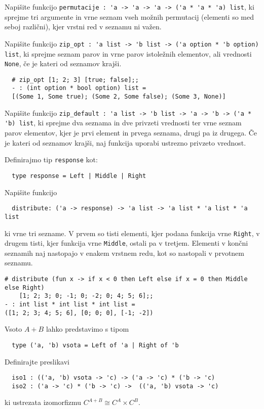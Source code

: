 \documentclass[arhiv]{../izpit}
\begin{document}
	


\naloga

\podnaloga
Napišite funkcijo \verb|permutacije : 'a -> 'a -> 'a -> ('a * 'a * 'a) list|, ki sprejme tri argumente in vrne seznam vseh možnih permutacij (elementi so med seboj različni), kjer vrstni red v seznamu ni važen.

\podnaloga
Napišite funkcijo \verb|zip_opt : 'a list -> 'b list -> ('a option * 'b option) list|, ki sprejme seznam parov in vrne parov istoležnih elementov, ali vrednosti \verb|None|, če je kateri od seznamov krajši.

\begin{verbatim}
  # zip_opt [1; 2; 3] [true; false];;
  - : (int option * bool option) list =
  [(Some 1, Some true); (Some 2, Some false); (Some 3, None)]
\end{verbatim}
  
\podnaloga
Napišite funkcijo \verb|zip_default : 'a list -> 'b list -> 'a -> 'b -> ('a * 'b) list|, ki sprejme dva seznama in dve privzeti vrednosti ter vrne seznam parov elementov, kjer je prvi element in prvega seznama, drugi pa iz drugega. Če je kateri od seznamov krajši, naj funkcija uporabi ustrezno privzeto vrednost.

\podnaloga
Definirajmo tip \verb|response| kot:
\begin{verbatim}
  type response = Left | Middle | Right
\end{verbatim}
Napišite funkcijo
\begin{verbatim}
  distribute: ('a -> response) -> 'a list -> 'a list * 'a list * 'a list
\end{verbatim}
ki vrne tri sezname. V prvem so tisti elementi, kjer podana funkcija vrne \verb|Right|, v drugem tisti, kjer funkcija vrne \verb|Middle|, ostali pa v tretjem. Elementi v končni seznamih naj nastopajo v enakem vrstnem redu, kot so nastopali v prvotnem seznamu.

\begin{verbatim}
# distribute (fun x -> if x < 0 then Left else if x = 0 then Middle else Right) 
    [1; 2; 3; 0; -1; 0; -2; 0; 4; 5; 6];;
- : int list * int list * int list =
([1; 2; 3; 4; 5; 6], [0; 0; 0], [-1; -2])
\end{verbatim}

\podnaloga
Vsoto $A + B$ lahko predstavimo s tipom
\begin{verbatim}
  type ('a, 'b) vsota = Left of 'a | Right of 'b
\end{verbatim}
Definirajte preslikavi
\begin{verbatim}
  iso1 : (('a, 'b) vsota -> 'c) -> ('a -> 'c) * ('b -> 'c)
  iso2 : ('a -> 'c) * ('b -> 'c) ->  (('a, 'b) vsota -> 'c)
\end{verbatim}
ki ustrezata izomorfizmu $C^{A + B} \cong C^A \times C^B$.
\end{document}
